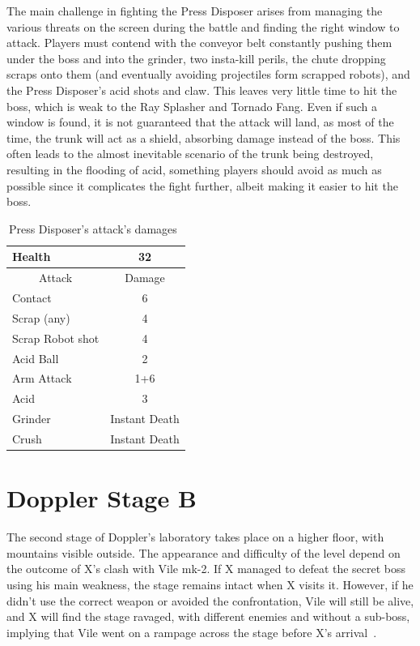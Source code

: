 The main challenge in fighting the Press Disposer arises from managing the various threats on the screen during the battle and finding the right window to attack. Players must contend with the conveyor belt constantly pushing them under the boss and into the grinder, two insta-kill perils, the chute dropping scraps onto them (and eventually avoiding projectiles form scrapped robots), and the Press Disposer's acid shots and claw. This leaves very little time to hit the boss, which is weak to the Ray Splasher and Tornado Fang. Even if such a window is found, it is not guaranteed that the attack will land, as most of the time, the trunk will act as a shield, absorbing damage instead of the boss. This often leads to the almost inevitable scenario of the trunk being destroyed, resulting in the flooding of acid, something players should avoid as much as possible since it complicates the fight further, albeit making it easier to hit the boss.

\begin{table}[htp]
	\centering
	\begin{tabular}[h]{l c}
		\toprule
		Health  & 32\\
		\midrule
		\multicolumn{1}{c}{Attack} & \multicolumn{1}{c}{Damage}\\
		Contact & 6\\
		Scrap (any)& 4\\
		Scrap Robot shot& 4\\
		Acid Ball& 2\\
		Arm Attack& 1+6\\
		Acid& 3\\
		Grinder& Instant Death\\
		Crush& Instant Death\\
		\bottomrule
	\end{tabular}
	\caption{Press Disposer's attack's damages~\cite{wiki:Byte,book:Compendium}}
\end{table} 

\section{Doppler Stage B}

The second stage of Doppler's laboratory takes place on a higher floor, with mountains visible outside. The appearance and difficulty of the level depend on the outcome of X's clash with Vile mk-2. If X managed to defeat the secret boss using his main weakness, the stage remains intact when X visits it. However, if he didn't use the correct weapon or avoided the confrontation, Vile will still be alive, and X will find the stage ravaged, with different enemies and without a sub-boss, implying that Vile went on a rampage across the stage before X's arrival~\cite{wiki:Doppler_stage}.

